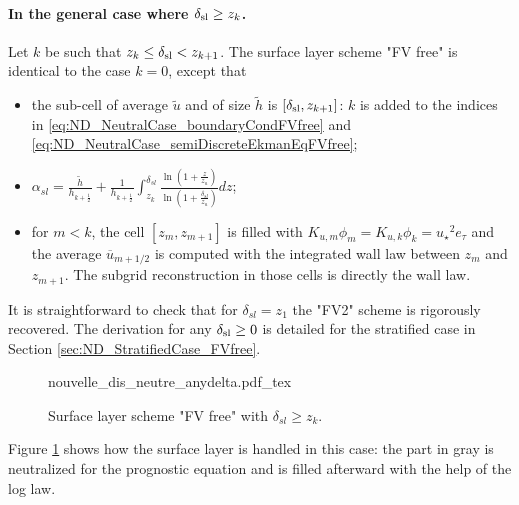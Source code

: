 \paragraph{In the general case where $\delta_{\rm sl} \geq z_k$.}
Let $k$ be such that $z_k \leq \delta_{\rm sl} < z_{k+1}$.
The surface layer scheme "FV free" is identical to the case $k=0$, except that
\begin{itemize}
	\item the sub-cell of average $\widetilde{u}$ and of size
		$\widetilde{h}$ is $[\delta_{\rm sl}, z_{k+1}]$:
		$k$ is added to the indices in 
		\eqref{eq:ND_NeutralCase_boundaryCondFVfree} and
		\eqref{eq:ND_NeutralCase_semiDiscreteEkmanEqFVfree};
	\item $\alpha_{sl} = \frac{\widetilde{h}}{h_{k+\frac{1}{2}}} +
		\frac{1}{h_{k+\frac{1}{2}}}\int_{z_k}^{\delta_{sl}}
		\frac{\ln(1+\frac{z}{z_{u}})}
			{\ln(1+\frac{\delta_{sl}}{z_{u}})} dz$;
	\item for $m < k$, the cell $[z_m, z_{m+1}]$ is filled with
		$K_{u,m} \phi_m = K_{u,k}\phi_k =
	{u_\star}^2e_\tau$
		and the average $\overline{u}_{m+1/2}$
		is computed with the integrated wall law
		between $z_m$ and $z_{m+1}$.
		The subgrid reconstruction in those cells is directly
		the wall law.
\end{itemize}
It is straightforward to check that for $\delta_{sl} = z_1$
the "FV2" scheme is rigorously recovered.
The derivation for any $\delta_{\rm sl} \geq 0$ is detailed for
the stratified case in Section \ref{sec:ND_StratifiedCase_FVfree}.
\begin{figure}
	{nouvelle_dis_neutre_anydelta.pdf_tex}
	\caption{ Surface layer scheme "FV free" with
	$\delta_{sl} \geq z_k$.}
	\label{fig:ND_NeutralCase_nouvelle_dis_neutre_anydelta}
\end{figure}
Figure \ref{fig:ND_NeutralCase_nouvelle_dis_neutre_anydelta}
shows how the surface layer is handled in this case: the part in gray
is neutralized for the prognostic equation and is filled afterward
with the help of the log law.
